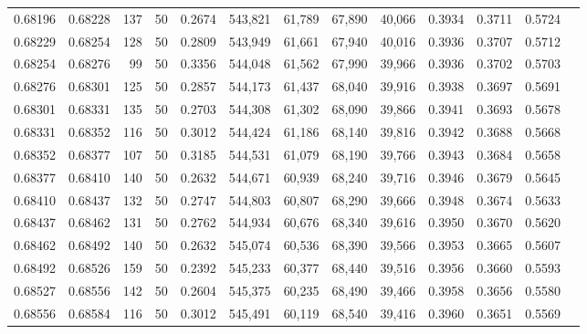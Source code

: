\begin{tabular}{rrrrrrrrrrrrr}
0.68196 & 0.68228 &   137 &  50 &                                     0.2674 & 543,821 &  61,789 &  67,890 &  40,066 & 0.3934 & 0.3711 & 0.5724 \\
0.68229 & 0.68254 &   128 &  50 &                                     0.2809 & 543,949 &  61,661 &  67,940 &  40,016 & 0.3936 & 0.3707 & 0.5712 \\
0.68254 & 0.68276 &    99 &  50 &                                     0.3356 & 544,048 &  61,562 &  67,990 &  39,966 & 0.3936 & 0.3702 & 0.5703 \\
0.68276 & 0.68301 &   125 &  50 &                                     0.2857 & 544,173 &  61,437 &  68,040 &  39,916 & 0.3938 & 0.3697 & 0.5691 \\
0.68301 & 0.68331 &   135 &  50 &                                     0.2703 & 544,308 &  61,302 &  68,090 &  39,866 & 0.3941 & 0.3693 & 0.5678 \\
0.68331 & 0.68352 &   116 &  50 &                                     0.3012 & 544,424 &  61,186 &  68,140 &  39,816 & 0.3942 & 0.3688 & 0.5668 \\
0.68352 & 0.68377 &   107 &  50 &                                     0.3185 & 544,531 &  61,079 &  68,190 &  39,766 & 0.3943 & 0.3684 & 0.5658 \\
0.68377 & 0.68410 &   140 &  50 &                                     0.2632 & 544,671 &  60,939 &  68,240 &  39,716 & 0.3946 & 0.3679 & 0.5645 \\
0.68410 & 0.68437 &   132 &  50 &                                     0.2747 & 544,803 &  60,807 &  68,290 &  39,666 & 0.3948 & 0.3674 & 0.5633 \\
0.68437 & 0.68462 &   131 &  50 &                                     0.2762 & 544,934 &  60,676 &  68,340 &  39,616 & 0.3950 & 0.3670 & 0.5620 \\
0.68462 & 0.68492 &   140 &  50 &                                     0.2632 & 545,074 &  60,536 &  68,390 &  39,566 & 0.3953 & 0.3665 & 0.5607 \\
0.68492 & 0.68526 &   159 &  50 &                                     0.2392 & 545,233 &  60,377 &  68,440 &  39,516 & 0.3956 & 0.3660 & 0.5593 \\
0.68527 & 0.68556 &   142 &  50 &                                     0.2604 & 545,375 &  60,235 &  68,490 &  39,466 & 0.3958 & 0.3656 & 0.5580 \\
0.68556 & 0.68584 &   116 &  50 &                                     0.3012 & 545,491 &  60,119 &  68,540 &  39,416 & 0.3960 & 0.3651 & 0.5569 \\

\end{tabular}
